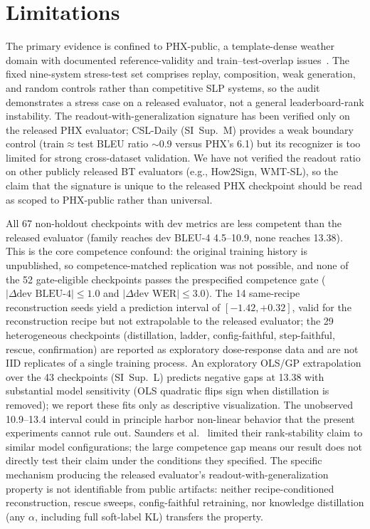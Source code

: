 \documentclass[pdflatex,sn-chicago]{sn-jnl}
\begin{document}
\section{Limitations}
\label{sec:limitations}
The primary evidence is confined to PHX-public, a template-dense weather domain with documented reference-validity and train--test-overlap issues~\cite{czehmann2026sacred,alkain2026critical}. The fixed nine-system stress-test set comprises replay, composition, weak generation, and random controls rather than competitive SLP systems, so the audit demonstrates a stress case on a released evaluator, not a general leaderboard-rank instability. The readout-with-generalization signature has been verified only on the released PHX evaluator; CSL-Daily (SI~Sup.~M) provides a weak boundary control (train$\approx$test BLEU ratio $\sim$0.9 versus PHX's 6.1) but its recognizer is too limited for strong cross-dataset validation. We have not verified the readout ratio on other publicly released BT evaluators (e.g., How2Sign, WMT-SL), so the claim that the signature is unique to the released PHX checkpoint should be read as scoped to PHX-public rather than universal.

All 67 non-holdout checkpoints with dev metrics are less competent than the released evaluator (family reaches dev BLEU-4 4.5--10.9, none reaches 13.38). This is the core competence confound: the original training history is unpublished, so competence-matched replication was not possible, and none of the 52 gate-eligible checkpoints passes the prespecified competence gate ($|\Delta\text{dev BLEU-4}|\leq 1.0$ and $|\Delta\text{dev WER}|\leq 3.0$). The 14 same-recipe reconstruction seeds yield a prediction interval of $[-1.42, +0.32]$, valid for the reconstruction recipe but not extrapolable to the released evaluator; the 29 heterogeneous checkpoints (distillation, ladder, config-faithful, step-faithful, rescue, confirmation) are reported as exploratory dose-response data and are not IID replicates of a single training process. An exploratory OLS/GP extrapolation over the 43 checkpoints (SI~Sup.~L) predicts negative gaps at 13.38 with substantial model sensitivity (OLS quadratic flips sign when distillation is removed); we report these fits only as descriptive visualization. The unobserved 10.9--13.4 interval could in principle harbor non-linear behavior that the present experiments cannot rule out. Saunders et al.~\cite{saunders2021continuous} limited their rank-stability claim to similar model configurations; the large competence gap means our result does not directly test their claim under the conditions they specified. The specific mechanism producing the released evaluator's readout-with-generalization property is not identifiable from public artifacts: neither recipe-conditioned reconstruction, rescue sweeps, config-faithful retraining, nor knowledge distillation (any $\alpha$, including full soft-label KL) transfers the property.
\end{document}
